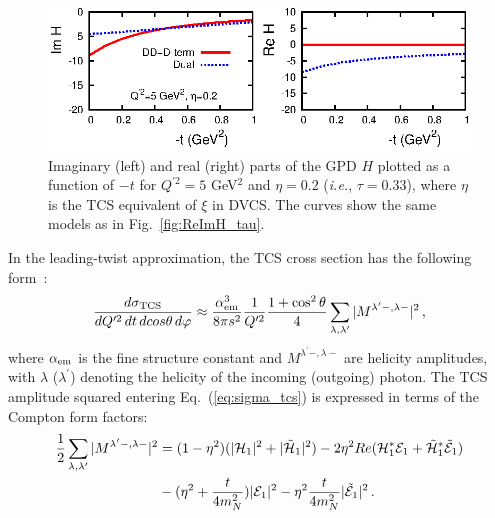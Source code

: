 \begin{figure}[t]
\begin{center}
\includegraphics[scale=1.5]{comp_DD_Dual_tdep_Q2_5.eps}
\end{center}
\caption{\small{Imaginary (left) and real (right) parts of the GPD $H$
plotted as a function of $-t$ for $Q^{\prime 2} = 5$ GeV$^2$ and
$\eta = 0.2$ (\textit{i.e.}, $\tau = 0.33$), where $\eta$ is the TCS
equivalent of $\xi$ in DVCS. The curves show the same models as in
Fig.~\ref{fig:ReImH_tau}.}}
\label{fig:ReImH_t}
\end{figure}

In the leading-twist approximation, the TCS cross section has
the following form~\cite{Berger:2001xd}:
\begin{equation}
\frac{d \sigma_{\rm TCS}}{dQ^{\prime 2} \,dt\, d cos \theta \, d \varphi} \approx \frac{\alpha^3_{\rm em}}{ 8 \pi s^2} \frac{1}{Q^{\prime 2}} \frac{1+\cos^2 \theta}{4} \sum_{\lambda,\lambda^{\prime}}
|M^{\lambda^{\prime}-,\lambda-}|^2 \,,
\label{eq:sigma_tcs}
\end{equation}
where $\alpha_{\rm em}$ is the fine structure constant and
$M^{\lambda^{\prime}-,\lambda-}$ are helicity amplitudes, with $\lambda$
($\lambda^{\prime}$) denoting the helicity of the incoming (outgoing) photon.
The TCS amplitude squared entering Eq.~(\ref{eq:sigma_tcs}) is expressed in
terms of the Compton form factors:
\begin{align}
\frac{1}{2}\sum_{\lambda,\lambda^{\prime}}|M^{\lambda^{\prime}-,\lambda-}|^2
&=(1-\eta^2)(|{\cal H}_1|^2+|\tilde{{\cal H}}_1|^2)-2 \eta^2 Re ({\cal H}_1^{\ast} {\cal E}_1+\tilde{{\cal H}}_1^{\ast} \tilde{{\cal E}}_1) 
\nonumber\\
&-(\eta^2+\frac{t}{4 m_N^2}) |{\cal E}_1|^2-\eta^2 \frac{t}{4 m_N^2} 
|\tilde{{\cal E}}_1|^2 \,.
\label{eq:m_tcs}
\end{align}

